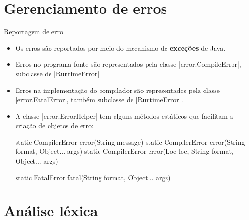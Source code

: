 \documentclass[smaller]{beamer}
\begin{document}
\section{Gerenciamento de erros}

\begin{frame}{Reportagem de erro}
  \begin{itemize}
    \item Os erros são reportados por meio do mecanismo de
    \textbf{exceções} de Java.
    \item Erros no programa fonte são representados pela classe
    \pyginline|error.CompileError|, subclasse de
    \pyginline|RuntimeError|.
    \item Erros na implementação do compilador são representados pela
    classe \pyginline|error.FatalError|, também subclasse de
    \pyginline|RuntimeError|.
    \item A classe \pyginline|error.ErrorHelper| tem alguns métodos
    estáticos que facilitam a criação de objetos de erro:
\begin{pygmented}[]
static CompilerError error(String message)
static CompilerError error(String format, Object... args)
static CompilerError error(Loc loc, String format, Object... args)

static FatalError fatal(String format, Object... args)
\end{pygmented}
  \end{itemize}
\end{frame}


\section{Análise léxica}
\end{document}
